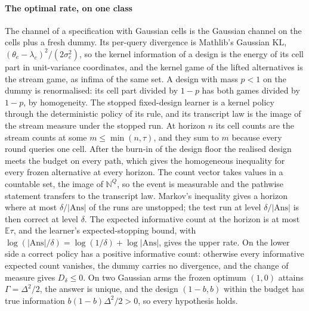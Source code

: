 \paragraph{The optimal rate, on one class} The channel of a specification with Gaussian cells is
the Gaussian channel on the cells plus a fresh dummy. Its per-query divergence is Mathlib's
Gaussian $\mathrm{KL}$, $(\theta_e-\lambda_e)^2/(2\sigma_e^2)$, so the kernel information of a
design is the energy of its cell part in unit-variance coordinates, and the kernel game of the
lifted alternatives is the stream game, as infima of the same set. A design with mass $p<1$ on
the dummy is renormalised: its cell part divided by $1-p$ has both games divided by $1-p$, by
homogeneity. The stopped fixed-design learner is a kernel policy through the deterministic
policy of its rule, and its transcript law is the image of the stream measure under the stopped
run. At horizon $n$ its cell counts are the stream counts at some $m\le\min(n,\tau)$, and they
sum to $m$ because every round queries one cell. After the burn-in of the design floor the
realised design meets the budget on every path, which gives the homogeneous inequality for every
frozen alternative at every horizon. The count vector takes values in a countable set, the image
of $\mathbb N^{Q}$, so the event is measurable and the pathwise statement transfers to the
transcript law. Markov's inequality gives a horizon where at most $\delta/|\mathrm{Ans}|$ of the
runs are unstopped; the test run at level $\delta/|\mathrm{Ans}|$ is then correct at level
$\delta$. The expected informative count at the horizon is at most $\mathbb E\tau$, and the
learner's expected-stopping bound, with $\log(|\mathrm{Ans}|/\delta)=\log(1/\delta)+\log|\mathrm{Ans}|$,
gives the upper rate. On the lower side a correct policy has a positive informative count:
otherwise every informative expected count vanishes, the dummy carries no divergence, and the
change of measure gives $D_\delta\le0$. On two Gaussian arms the frozen optimum $(1,0)$ attains
$\Gamma=\Delta^2/2$, the answer is unique, and the design $(1-b,b)$ within the budget has true
information $b(1-b)\Delta^2/2>0$, so every hypothesis holds.

